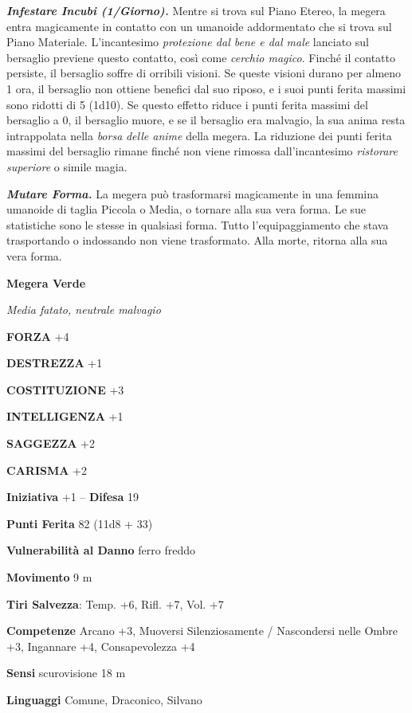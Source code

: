 \begin{multicols}{2}
\emph{\textbf{Infestare Incubi (1/Giorno).}} Mentre si trova sul Piano Etereo, la megera entra magicamente in contatto con un umanoide addormentato che si trova sul Piano Materiale. L'incantesimo \emph{protezione dal bene e dal male} lanciato sul bersaglio previene questo contatto, così come \emph{cerchio magico}. Finché il contatto persiste, il bersaglio soffre di orribili visioni. Se queste visioni durano per almeno 1 ora, il bersaglio non ottiene benefici dal suo riposo, e i suoi punti ferita massimi sono ridotti di 5 (1d10). Se questo effetto riduce i punti ferita massimi del bersaglio a 0, il bersaglio muore, e se il bersaglio era malvagio, la sua anima resta intrappolata nella \emph{borsa} \emph{delle anime} della megera. La riduzione dei punti ferita massimi del bersaglio rimane finché non viene rimossa dall'incantesimo \emph{ristorare} \emph{superiore} o simile magia.

\emph{\textbf{Mutare Forma.}} La megera può trasformarsi magicamente in una femmina umanoide di taglia Piccola o Media, o tornare alla sua vera forma. Le sue statistiche sono le stesse in qualsiasi forma. Tutto l'equipaggiamento che stava trasportando o indossando non viene trasformato. Alla morte, ritorna alla sua vera forma.



\medskip{}\textbf{Megera Verde}

\emph{Media fatato, neutrale malvagio}

\textbf{FORZA} +4

\textbf{DESTREZZA} +1

\textbf{COSTITUZIONE} +3

\textbf{INTELLIGENZA} +1

\textbf{SAGGEZZA} +2

\textbf{CARISMA} +2

\textbf{Iniziativa} +1 -- \textbf{Difesa} 19

\textbf{Punti Ferita} 82 (11d8 + 33)

\textbf{Vulnerabilità al Danno} ferro freddo

\textbf{Movimento} 9 m

\textbf{Tiri Salvezza}: Temp. +6, Rifl. +7, Vol. +7

\textbf{Competenze} Arcano +3, Muoversi Silenziosamente / Nascondersi nelle Ombre +3, Ingannare +4, Consapevolezza +4

\textbf{Sensi} scurovisione 18 m

\textbf{Linguaggi} Comune, Draconico, Silvano


\end{multicols}
